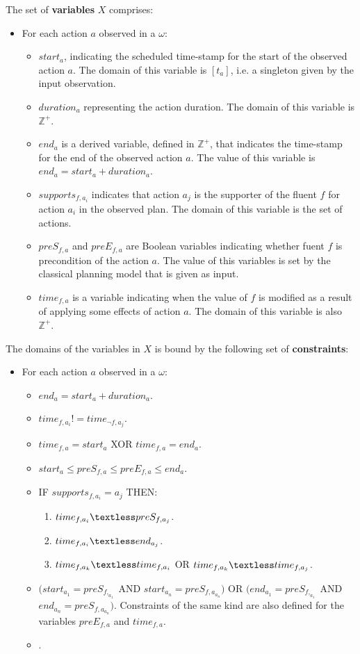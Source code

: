 \documentclass[letterpaper]{article} %
\begin{document}
The set of {\bf variables} $X$ comprises:
\begin{itemize}
\item For each action $a$ observed in a $\omega$:
\begin{itemize}
\item $start_a$, indicating the scheduled time-stamp for the start of the observed action $a$. The domain of this variable is $[t_a]$, i.e. a singleton given by the input observation.
\item $duration_a$ representing the action duration. The domain of this variable is $\mathds{Z}^+$.
\item $end_a$ is a derived variable, defined in $\mathds{Z}^+$, that indicates the time-stamp for the end of the observed action $a$. The value of this variable is $end_a = start_a + duration_a$. 
\item $supports_{f,a_i}$ indicates that action $a_j$ is the supporter of the fluent $f$ for action $a_i$ in the observed plan. The domain of this variable is the set of actions.
\item $preS_{f,a}$ and $preE_{f,a}$ are Boolean variables indicating whether fuent $f$ is precondition of the action $a$. The value of this variables is set by the classical planning model that is given as input.
\item $time_{f,a}$ is a variable indicating when the value of $f$ is modified as a result of applying some effects of action $a$. The domain of this variable is also $\mathds{Z}^+$.
\end{itemize}
\end{itemize}

The domains of the variables in $X$ is bound by the following set of {\bf constraints}:
\begin{itemize}
\item For each action $a$ observed in a $\omega$:
\begin{itemize}
\item $end_a = start_a + duration_a$.
\item $time_{f,a_i}!=time_{\neg f,a_j}$.
\item $time_{f,a}= start_a$ XOR $time_{f,a}= end_a$.
\item $start_a\leq preS_{f,a}\leq preE_{f,a}\leq end_a$.
\item IF $supports_{f,a_i}=a_j$ THEN:
\begin{enumerate}
\item $time_{f,a_i}\textless  preS_{f,a_j}$.
\item $time_{f,a_i}\textless  end_{a_j}$.
\item $time_{f,a_k}\textless time_{f,a_i}$ OR $time_{f,a_k}\textless time_{f,a_j}$.
\end{enumerate}
\item $(start_{a_1} = preS_{f,_{a_1}}$ AND $start_{a_n} = preS_{f,a_{a_n}})$ OR $(end_{a_1} = preS_{f,_{a_1}}$ AND $end_{a_n} = preS_{f,a_{a_n}})$. Constraints of the same kind are also defined for the variables $preE_{f,a}$ and $time_{f,a}$.
\item .
\end{itemize}
\end{itemize}
\end{document}
